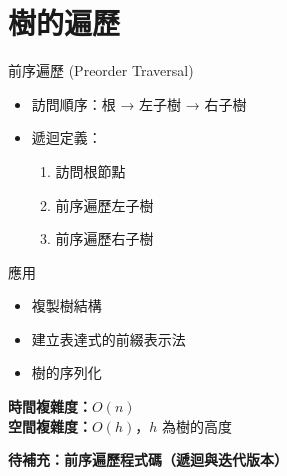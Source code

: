 \documentclass{beamer}
\begin{document}
\section{樹的遍歷}

\begin{frame}{前序遍歷 (Preorder Traversal)}
\begin{itemize}
    \item 訪問順序：根 → 左子樹 → 右子樹
    \item 遞迴定義：
    \begin{enumerate}
        \item 訪問根節點
        \item 前序遍歷左子樹
        \item 前序遍歷右子樹
    \end{enumerate}
\end{itemize}

\vspace{1em}
\begin{block}{應用}
\begin{itemize}
    \item 複製樹結構
    \item 建立表達式的前綴表示法
    \item 樹的序列化
\end{itemize}
\end{block}

\vspace{1em}
\textbf{時間複雜度：}$O(n)$\\
\textbf{空間複雜度：}$O(h)$，$h$ 為樹的高度

\vspace{1em}
\textbf{待補充：前序遍歷程式碼（遞迴與迭代版本）}
\end{frame}
\end{document}
